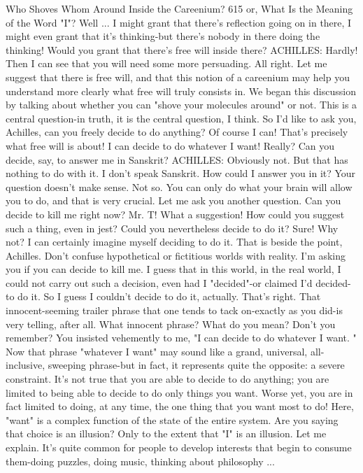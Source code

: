 Who Shoves Whom Around Inside the Careenium?                                      615
or, What Is the Meaning of the Word "I"?
\achilles Well ... I might grant that there's reflection going on in there, I might
  even grant that it's thinking-but there's nobody in there doing the thinking!
\tortoise Would you grant that there's free will inside there? ACHILLES: Hardly!
\tortoise Then I can see that you will need some more persuading. All right. Let
  me suggest that there is free will, and that this notion of a careenium may help you
  understand more clearly what free will truly consists in. We began this discussion
  by talking about whether you can "shove your molecules around" or not. This is a
  central question-in truth, it is the central question, I think. So I'd like to ask you,
  Achilles, can you freely decide to do anything?
\achilles Of course I can! That's precisely what free will is about! I can decide to
  do whatever I want!
\tortoise Really? Can you decide, say, to answer me in Sanskrit? ACHILLES:
  Obviously not. But that has nothing to do with it. I don't speak Sanskrit. How could
  I answer you in it? Your question doesn't make sense.
\tortoise Not so. You can only do what your brain will allow you to do, and that
  is very crucial. Let me ask you another question. Can you decide to kill me right
  now?
\achilles Mr. T! What a suggestion! How could you suggest such a thing, even in
  jest?
\tortoise Could you nevertheless decide to do it?
\achilles Sure! Why not? I can certainly imagine myself deciding to do it.
\tortoise That is beside the point, Achilles. Don't confuse hypothetical or
  fictitious worlds with reality. I'm asking you if you can decide to kill me.
\achilles I guess that in this world, in the real world, I could not carry out such a
  decision, even had I "decided"-or claimed I'd decided-to do it. So I guess I couldn't
  decide to do it, actually.
\tortoise That's right. That innocent-seeming trailer phrase that one tends to tack
  on-exactly as you did-is very telling, after all.
\achilles What innocent phrase? What do you mean?
\tortoise Don't you remember? You insisted vehemently to me, "I can decide to
  do whatever I want. " Now that phrase "whatever I want" may sound like a grand,
  universal, all-inclusive, sweeping phrase-but in fact, it represents quite the
  opposite: a severe constraint. It's not true that you are able to decide to do
  anything; you are limited to being able to decide to do only things you want.
  Worse yet, you are in fact limited to doing, at any time, the one thing that you want
  most to do! Here, "want" is a complex function of the state of the entire system.
\achilles Are you saying that choice is an illusion?
\tortoise Only to the extent that "I" is an illusion. Let me explain. It's quite
  common for people to develop interests that begin to consume them-doing puzzles,
  doing music, thinking about philosophy ...




